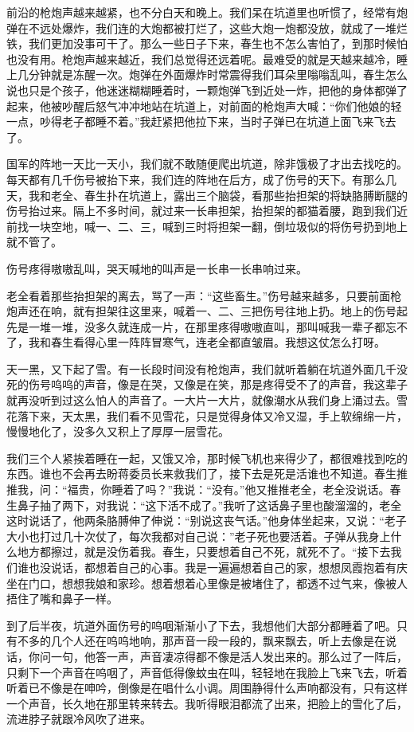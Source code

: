 \documentclass[12pt,UTF8]{ctexbook}
\begin{document}
前沿的枪炮声越来越紧，也不分白天和晚上。我们呆在坑道里也听惯了，经常有炮弹在不远处爆炸，我们连的大炮都被打烂了，这些大炮一炮都没放，就成了一堆烂铁，我们更加没事可干了。那么一些日子下来，春生也不怎么害怕了，到那时候怕也没有用。枪炮声越来越近，我们总觉得还远着呢。最难受的就是天越来越冷，睡上几分钟就是冻醒一次。炮弹在外面爆炸时常震得我们耳朵里嗡嗡乱叫，春生怎么说也只是个孩子，他迷迷糊糊睡着时，一颗炮弹飞到近处一炸，把他的身体都弹了起来，他被吵醒后怒气冲冲地站在坑道上，对前面的枪炮声大喊：“你们他娘的轻一点，吵得老子都睡不着。”我赶紧把他拉下来，当时子弹已在坑道上面飞来飞去了。

国军的阵地一天比一天小，我们就不敢随便爬出坑道，除非饿极了才出去找吃的。每天都有几千伤号被抬下来，我们连的阵地在后方，成了伤号的天下。有那么几天，我和老全、春生扑在坑道上，露出三个脑袋，看那些抬担架的将缺胳膊断腿的伤号抬过来。隔上不多时间，就过来一长串担架，抬担架的都猫着腰，跑到我们近前找一块空地，喊一、二、三，喊到三时将担架一翻，倒垃圾似的将伤号扔到地上就不管了。

伤号疼得嗷嗷乱叫，哭天喊地的叫声是一长串一长串响过来。

老全看着那些抬担架的离去，骂了一声：“这些畜生。”伤号越来越多，只要前面枪炮声还在响，就有担架往这里来，喊着一、二、三把伤号往地上扔。地上的伤号起先是一堆一堆，没多久就连成一片，在那里疼得嗷嗷直叫，那叫喊我一辈子都忘不了，我和春生看得心里一阵阵冒寒气，连老全都直皱眉。我想这仗怎么打呀。

天一黑，又下起了雪。有一长段时间没有枪炮声，我们就听着躺在坑道外面几千没死的伤号呜呜的声音，像是在哭，又像是在笑，那是疼得受不了的声音，我这辈子就再没听到过这么怕人的声音了。一大片一大片，就像潮水从我们身上涌过去。雪花落下来，天太黑，我们看不见雪花，只是觉得身体又冷又湿，手上软绵绵一片，慢慢地化了，没多久又积上了厚厚一层雪花。

我们三个人紧挨着睡在一起，又饿又冷，那时候飞机也来得少了，都很难找到吃的东西。谁也不会再去盼蒋委员长来救我们了，接下去是死是活谁也不知道。春生推推我，问：“福贵，你睡着了吗？”我说：“没有。”他又推推老全，老全没说话。春生鼻子抽了两下，对我说：“这下活不成了。”我听了这话鼻子里也酸溜溜的，老全这时说话了，他两条胳膊伸了伸说：“别说这丧气话。”他身体坐起来，又说：“老子大小也打过几十次仗了，每次我都对自己说：”老子死也要活着。子弹从我身上什么地方都擦过，就是没伤着我。春生，只要想着自己不死，就死不了。“接下去我们谁也没说话，都想着自己的心事。我是一遍遍想着自己的家，想想凤霞抱着有庆坐在门口，想想我娘和家珍。想着想着心里像是被堵住了，都透不过气来，像被人捂住了嘴和鼻子一样。

到了后半夜，坑道外面伤号的呜咽渐渐小了下去，我想他们大部分都睡着了吧。只有不多的几个人还在呜呜地响，那声音一段一段的，飘来飘去，听上去像是在说话，你问一句，他答一声，声音凄凉得都不像是活人发出来的。那么过了一阵后，只剩下一个声音在呜咽了，声音低得像蚊虫在叫，轻轻地在我脸上飞来飞去，听着听着已不像是在呻吟，倒像是在唱什么小调。周围静得什么声响都没有，只有这样一个声音，长久地在那里转来转去。我听得眼泪都流了出来，把脸上的雪化了后，流进脖子就跟冷风吹了进来。
\end{document}
